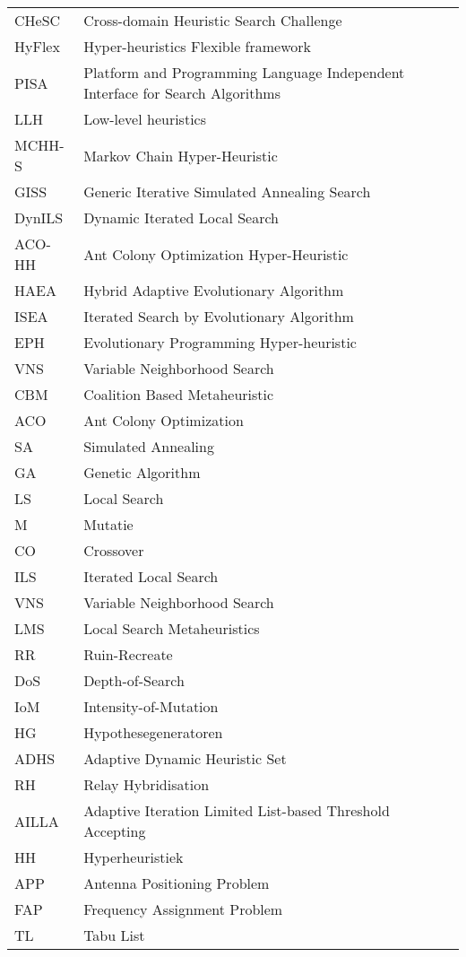 \begin{flushleft}
  \renewcommand{\arraystretch}{1.1}
  \begin{tabularx}{\textwidth}{@{}p{20mm}X@{}}%
    CHeSC	&Cross-domain Heuristic Search Challenge\\
    HyFlex	&Hyper-heuristics Flexible framework\\
    PISA	&Platform and Programming Language Independent Interface for Search Algorithms\\
    LLH		&Low-level heuristics \\
    MCHH-S	&Markov Chain Hyper-Heuristic\\
    GISS	&Generic Iterative Simulated Annealing Search\\
    DynILS	&Dynamic Iterated Local Search\\
    ACO-HH	&Ant Colony Optimization Hyper-Heuristic\\
    HAEA	&Hybrid Adaptive Evolutionary Algorithm\\
    ISEA	&Iterated Search by Evolutionary Algorithm\\
    EPH		&Evolutionary Programming Hyper-heuristic\\
    VNS		&Variable Neighborhood Search\\
    CBM		&Coalition Based Metaheuristic\\
    ACO		&Ant Colony Optimization\\
    SA		&Simulated Annealing\\
    GA		&Genetic Algorithm\\
    LS		&Local Search\\
    M		&Mutatie\\
    CO		&Crossover\\
    ILS		&Iterated Local Search\\
    VNS		&Variable Neighborhood Search\\
    LMS		&Local Search Metaheuristics\\
    RR		&Ruin-Recreate\\
    DoS		&Depth-of-Search\\
    IoM		&Intensity-of-Mutation\\
    HG		&Hypothesegeneratoren\\
    ADHS	&Adaptive Dynamic Heuristic Set\\
    RH		&Relay Hybridisation\\
    AILLA	&Adaptive Iteration Limited List-based Threshold Accepting\\
    HH		&Hyperheuristiek\\
    APP		&Antenna Positioning Problem\\
    FAP		&Frequency Assignment Problem\\
    TL		&Tabu List\\
  \end{tabularx}
\end{flushleft}
